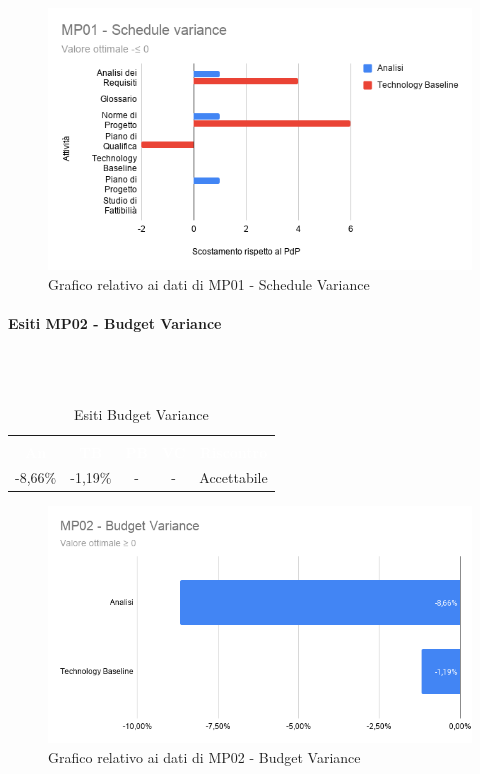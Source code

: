 \begin{figure}[H]
\centering
\includegraphics[scale=0.5]{./img/MP01_schedule_variance.png}
\caption{Grafico relativo ai dati di MP01 - Schedule Variance}
\end{figure}

\paragraph{Esiti MP02 - Budget Variance} \mbox{} \\ \mbox{} \\
\begin{longtable}{c c c c c}
\rowcolor{white}\caption{Esiti Budget Variance} \\
		\rowcolor{redafk}
\textcolor{white}{\textbf{An}} &
\textcolor{white}{\textbf{TB}} &
\textcolor{white}{\textbf{PB}} &
\textcolor{white}{\textbf{VC}} &
\textcolor{white}{\textbf{Riscontro}} \\
-8,66$\%$ &
-1,19$\%$ &
- &
- &
Accettabile \\
\end{longtable}

\begin{figure}[H]
\centering
\includegraphics[scale=0.5]{./img/MP02_budget_variance.png}
\caption{Grafico relativo ai dati di MP02 - Budget Variance}
\end{figure}

